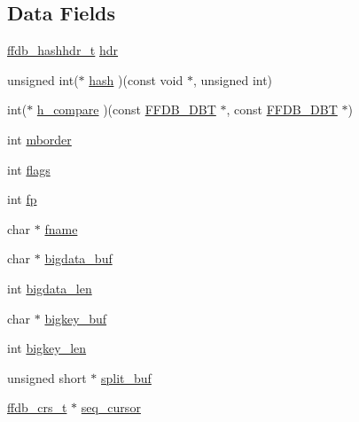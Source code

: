 \subsection*{Data Fields}
\begin{DoxyCompactItemize}
\item 
\mbox{\hyperlink{adat-devel_2other__libs_2filedb_2filehash_2ffdb__hash_8h_aab0f28f6f6872895710d2edc192c8d3a}{ffdb\+\_\+hashhdr\+\_\+t}} \mbox{\hyperlink{structhtab_ace908dbb78be497aeb76124ebf0e26b5}{hdr}}
\item 
unsigned int($\ast$ \mbox{\hyperlink{structhtab_a705be8be2988b8599498615d0f9aa3ec}{hash}} )(const void $\ast$, unsigned int)
\item 
int($\ast$ \mbox{\hyperlink{structhtab_a33e1d003e5f96a3b91f9239ef970a415}{h\+\_\+compare}} )(const \mbox{\hyperlink{adat-devel_2other__libs_2filedb_2filehash_2ffdb__db_8h_aa2e0984399491df0fdd20898ca8758f9}{F\+F\+D\+B\+\_\+\+D\+BT}} $\ast$, const \mbox{\hyperlink{adat-devel_2other__libs_2filedb_2filehash_2ffdb__db_8h_aa2e0984399491df0fdd20898ca8758f9}{F\+F\+D\+B\+\_\+\+D\+BT}} $\ast$)
\item 
int \mbox{\hyperlink{structhtab_a3d3e7570e07708a89d0e835609310464}{mborder}}
\item 
int \mbox{\hyperlink{structhtab_aec553f223cf81af78090be98b9e4a132}{flags}}
\item 
int \mbox{\hyperlink{structhtab_a3d34e277d5fe6638f28fd17f0627ce10}{fp}}
\item 
char $\ast$ \mbox{\hyperlink{structhtab_a2e699b43ff625c1419e150beec230ab3}{fname}}
\item 
char $\ast$ \mbox{\hyperlink{structhtab_a5dab77daa04419ec7a918dac8c792cdd}{bigdata\+\_\+buf}}
\item 
int \mbox{\hyperlink{structhtab_a6c9a0fed7b96ac07dbe0d82a9cfdeb29}{bigdata\+\_\+len}}
\item 
char $\ast$ \mbox{\hyperlink{structhtab_a345c469a2f086b60d390dc74c086d323}{bigkey\+\_\+buf}}
\item 
int \mbox{\hyperlink{structhtab_a13d0d4e3ecdde7a7b11a846396255cd0}{bigkey\+\_\+len}}
\item 
unsigned short $\ast$ \mbox{\hyperlink{structhtab_a7d9a4d73113dadda7d6501657a53358c}{split\+\_\+buf}}
\item 
\mbox{\hyperlink{adat-devel_2other__libs_2filedb_2filehash_2ffdb__hash_8h_a103d84beefb6d7306cb252c4d7f25479}{ffdb\+\_\+crs\+\_\+t}} $\ast$ \mbox{\hyperlink{structhtab_a596f77e06b4b020288be1edf0bf9f62b}{seq\+\_\+cursor}}
\item 

\end{DoxyCompactItemize}
